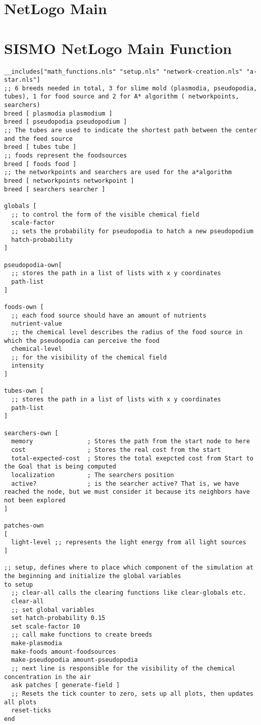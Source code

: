 
\section{NetLogo Main}
\section{SISMO NetLogo Main Function}
\lstset{language=NetLogo}
\begin{lstlisting}
__includes["math_functions.nls" "setup.nls" "network-creation.nls" "a-star.nls"]
;; 6 breeds needed in total, 3 for slime mold (plasmodia, pseudopodia, tubes), 1 for food source and 2 for A* algorithm ( networkpoints, searchers)
breed [ plasmodia plasmodium ]
breed [ pseudopodia pseudopodium ]
;; The tubes are used to indicate the shortest path between the center and the feed source
breed [ tubes tube ]
;; foods represent the foodsources
breed [ foods food ]
;; the networkpoints and searchers are used for the a*algorithm
breed [ networkpoints networkpoint ]
breed [ searchers searcher ]

globals [
  ;; to control the form of the visible chemical field
  scale-factor
  ;; sets the probability for pseudopodia to hatch a new pseudopodium
  hatch-probability
]

pseudopodia-own[
  ;; stores the path in a list of lists with x y coordinates
  path-list
]

foods-own [
  ;; each food source should have an amount of nutrients
  nutrient-value
  ;; the chemical level describes the radius of the food source in which the pseudopodia can perceive the food
  chemical-level
  ;; for the visibility of the chemical field
  intensity
]

tubes-own [
  ;; stores the path in a list of lists with x y coordinates
  path-list
]

searchers-own [
  memory               ; Stores the path from the start node to here
  cost                 ; Stores the real cost from the start
  total-expected-cost  ; Stores the total exepcted cost from Start to the Goal that is being computed
  localization         ; The searchers position
  active?              ; is the searcher active? That is, we have reached the node, but we must consider it because its neighbors have not been explored
]

patches-own
[
  light-level ;; represents the light energy from all light sources
]

;; setup, defines where to place which component of the simulation at the beginning and initialize the global variables
to setup
  ;; clear-all calls the clearing functions like clear-globals etc.
  clear-all
  ;; set global variables
  set hatch-probability 0.15
  set scale-factor 10
  ;; call make functions to create breeds
  make-plasmodia
  make-foods amount-foodsources
  make-pseudopodia amount-pseudopodia
  ;; next line is responsible for the visibility of the chemical concentration in the air
  ask patches [ generate-field ]
  ;; Resets the tick counter to zero, sets up all plots, then updates all plots
  reset-ticks
end


\end{lstlisting}
